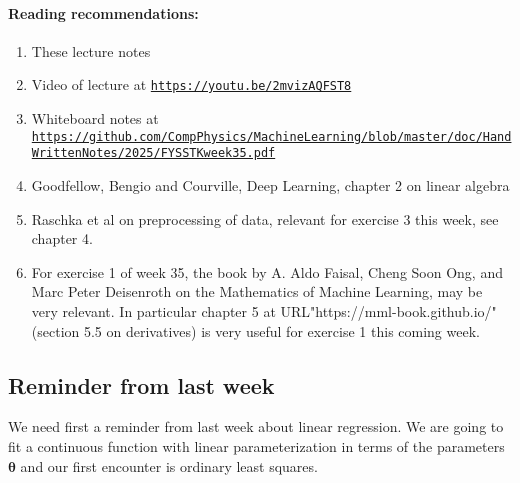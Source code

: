 \documentclass[%
oneside,                 %
final,                   %
10pt]{article}
\begin{document}
\noindent
\paragraph{Reading recommendations:}
\begin{enumerate}
\item These lecture notes

\item Video of lecture at \href{{https://youtu.be/2mvizAQFST8}}{\nolinkurl{https://youtu.be/2mvizAQFST8}}

\item Whiteboard notes  at \href{{https://github.com/CompPhysics/MachineLearning/blob/master/doc/HandWrittenNotes/2025/FYSSTKweek35.pdf}}{\nolinkurl{https://github.com/CompPhysics/MachineLearning/blob/master/doc/HandWrittenNotes/2025/FYSSTKweek35.pdf}}

\item Goodfellow, Bengio and Courville, Deep Learning, chapter 2 on linear algebra

\item Raschka et al on preprocessing of data, relevant for exercise 3 this week, see chapter 4.

\item For exercise 1 of week 35, the book by A. Aldo Faisal, Cheng Soon Ong, and Marc Peter Deisenroth on the Mathematics of Machine Learning, may be very relevant. In particular chapter 5 at URL"https://mml-book.github.io/" (section 5.5 on derivatives) is very useful for exercise 1 this coming week.
\end{enumerate}

\noindent
\subsection*{Reminder from last week}

We need first a reminder from last week about linear regression. We are going to fit a continuous function with linear parameterization in terms of the parameters  $\bm{\theta}$ and our first encounter is ordinary least squares.
\end{document}
